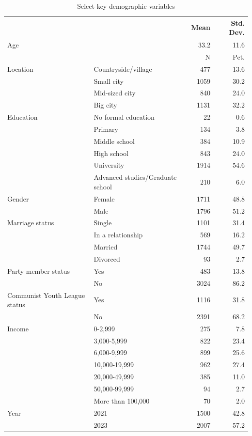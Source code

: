 \documentclass[
  letterpaper,
  DIV=11,
  numbers=noendperiod]{scrartcl}
\begin{document}
\begin{longtable}[t]{llrr}

\caption{\label{tbl-demographics}Select key demographic variables}

\tabularnewline

\toprule
  &    & Mean & Std. Dev.\\
\midrule
Age &  & 33.2 & 11.6\\
\midrule
 &  & N & Pct.\\
Location & Countryside/village & 477 & 13.6\\
 & Small city & 1059 & 30.2\\
 & Mid-sized city & 840 & 24.0\\
 & Big city & 1131 & 32.2\\
Education & No formal education & 22 & 0.6\\
 & Primary & 134 & 3.8\\
 & Middle school & 384 & 10.9\\
 & High school & 843 & 24.0\\
 & University & 1914 & 54.6\\
 & Advanced studies/Graduate school & 210 & 6.0\\
Gender & Female & 1711 & 48.8\\
 & Male & 1796 & 51.2\\
Marriage status & Single & 1101 & 31.4\\
 & In a relationship & 569 & 16.2\\
 & Married & 1744 & 49.7\\
 & Divorced & 93 & 2.7\\
Party member status & Yes & 483 & 13.8\\
 & No & 3024 & 86.2\\
Communist Youth League status & Yes & 1116 & 31.8\\
 & No & 2391 & 68.2\\
Income & 0-2,999 & 275 & 7.8\\
 & 3,000-5,999 & 822 & 23.4\\
 & 6,000-9,999 & 899 & 25.6\\
 & 10,000-19,999 & 962 & 27.4\\
 & 20,000-49,999 & 385 & 11.0\\
 & 50,000-99,999 & 94 & 2.7\\
 & More than 100,000 & 70 & 2.0\\
Year & 2021 & 1500 & 42.8\\
 & 2023 & 2007 & 57.2\\
\bottomrule

\end{longtable}
\end{document}
